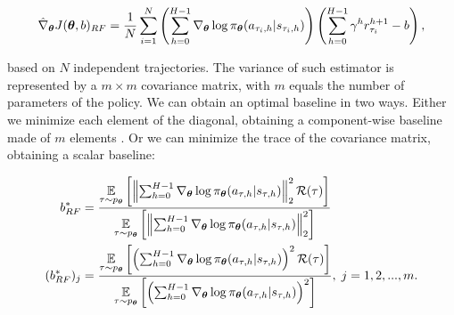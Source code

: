 \begin{align}
\hat{\nabla}_{\boldsymbol{\theta}}J(\boldsymbol{\theta}, b)_{RF} = \frac{1}{N}\sum_{i=1}^{N}\left(\sum_{h=0}^{H-1}\nabla_{\boldsymbol{\theta}}\log\pi_{\boldsymbol{\theta}}(a_{\tau_i,h}|s_{\tau_i,h}) \right)\left(\sum_{h=0}^{H-1}\gamma^h r^{h+1}_{\tau_i} - b \right), \label{eq:REINFORCE}
\end{align}

based on $N$ independent trajectories. The variance of such estimator is represented by a $m\times m$ covariance matrix, with $m$ equals the number of parameters of the policy. We can obtain an optimal baseline in two ways. Either we minimize each element of the diagonal, obtaining a component-wise baseline made of $m$ elements \cite{peters2008reinforcement}. Or we can minimize the trace of the covariance matrix, obtaining a scalar baseline\cite{zhao2011analysis}:

\begin{align}
b^*_{RF} &= \frac{\underset{\tau\sim p_{\boldsymbol{\theta}}}{\mathbb{E}}\left[{\left\lVert\sum_{h=0}^{H-1}\nabla_{\boldsymbol{\theta}}\log\pi_{\boldsymbol{\theta}}(a_{\tau,h}|s_{\tau,h})\right\rVert_2^2\mathcal{R}(\tau)}\right]}{\underset{\tau\sim p_{\boldsymbol{\theta}}}{\mathbb{E}}\left[{\left\lVert\sum_{h=0}^{H-1}\nabla_{\boldsymbol{\theta}}\log\pi_{\boldsymbol{\theta}}(a_{\tau,h}|s_{\tau,h})\right\rVert_2^2}\right]} \\
(b^*_{RF})_{j} &= \frac{\underset{\tau\sim p_{\boldsymbol{\theta}}}{\mathbb{E}}\left[{\left(\sum_{h=0}^{H-1}\nabla_{\boldsymbol{\theta}}\log\pi_{\boldsymbol{\theta}}(a_{\tau,h}|s_{\tau,h})\right)^2\mathcal{R}(\tau)}\right]}{\underset{\tau\sim p_{\boldsymbol{\theta}}}{\mathbb{E}}\left[{\left(\sum_{h=0}^{H-1}\nabla_{\boldsymbol{\theta}}\log\pi_{\boldsymbol{\theta}}(a_{\tau,h}|s_{\tau,h})\right)^2}\right]}, \; j=1,2,...,m.
\end{align}

